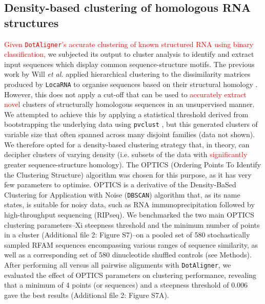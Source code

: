 \documentclass{bmcart}
\newcommand\dotaligner{\texttt{DotAligner}}
\newcommand\locarna{\texttt{LocaRNA}}
\begin{document}
\subsection*{Density-based clustering of homologous RNA structures}

\textcolor{red}{Given \dotaligner{}'s accurate clustering of known structured RNA using
binary classification,} we subjected its
output to cluster analysis to identify and extract input sequences which display common
sequence-structure motifs. The previous work by Will \textit{et al.} applied hierarchical clustering 
to the dissimilarity matrices produced by \locarna{} to organise sequences based on their
structural homology \cite{Will17432929}. However, this does not apply a cut-off that can be used 
to \textcolor{red}{accurately extract novel} clusters of structurally homologous sequences in an unsupervised 
manner. We attempted to achieve this by applying a statistical threshold derived from 
bootstrapping the underlying data using \texttt{pvclust} \cite{suzuki2006pvclust}, but this
generated clusters of variable size that often spanned across many disjoint families 
(data not shown).\\

We therefore opted for a density-based clustering strategy that, in theory, can decipher 
clusters of varying density (i.e. subsets of the data with \textcolor{red}{significantly} greater sequence-structure homology). The OPTICS (Ordering Points To Identify the Clustering Structure) algorithm \cite{ankerst99ordering} was chosen for this purpose, as it has very few parameters to optimise. 
OPTICS is a derivative of the Density-BaSed Clustering for Application with Noise
 (\texttt{DBSCAN}) \cite{ester1996density} algorithm that, as its name states, is suitable 
 for noisy data, such as RNA immunoprecipitation followed by high-throughput sequencing 
 (RIPseq). We  benchmarked the two main OPTICS clustering parameters--Xi steepness threshold 
and the minimum number of points in a cluster (Additional file 2: Figure S7)--on 
a pooled set of 580 stochastically sampled RFAM sequences encompassing various ranges of sequence similarity, as well as a corresponding set of 580 dinucleotide shuffled controls (see Methods). 
After performing all versus all pairwise alignments with \dotaligner{}, 
we evaluated the effect of OPTICS parameters on clustering performance, 
revealing that a minimum of 4 points (or sequences) and a steepness threshold of 0.006 
gave the best results (Additional file 2: Figure S7A). \\
\end{document}
